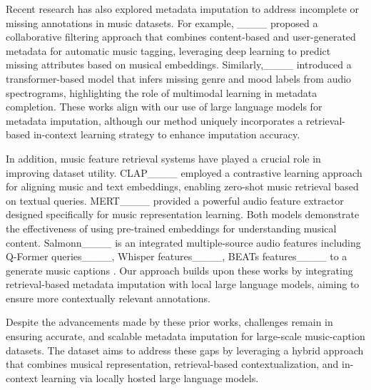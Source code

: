 Recent research has also explored metadata imputation to address incomplete or missing annotations in music datasets. For example, ____ proposed a collaborative filtering approach that combines content-based and user-generated metadata for automatic music tagging, leveraging deep learning to predict missing attributes based on musical embeddings. Similarly,____ introduced a transformer-based model that infers missing genre and mood labels from audio spectrograms, highlighting the role of multimodal learning in metadata completion. These works align with our use of large language models for metadata imputation, although our method uniquely incorporates a retrieval-based in-context learning strategy to enhance imputation accuracy.

In addition, music feature retrieval systems have played a crucial role in improving dataset utility. CLAP____ employed a contrastive learning approach for aligning music and text embeddings, enabling zero-shot music retrieval based on textual queries. MERT____ provided a powerful audio feature extractor designed specifically for music representation learning. Both models demonstrate the effectiveness of using pre-trained embeddings for understanding musical content. Salmonn____ is an integrated multiple-source audio features including Q-Former queries____, Whisper features____, BEATs features____ to a generate music captions . Our approach builds upon these works by integrating retrieval-based metadata imputation with local large language models, aiming to ensure more contextually relevant annotations.

Despite the advancements made by these prior works, challenges remain in ensuring accurate, and scalable metadata imputation for large-scale music-caption datasets. The \textbf{\dataset} dataset aims to address these gaps by leveraging a hybrid approach that combines musical representation, retrieval-based contextualization, and in-context learning via locally hosted large language models.